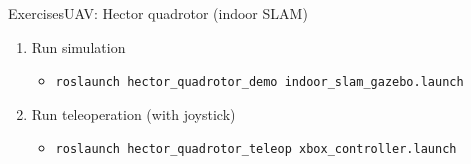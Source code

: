 \documentclass[10pt,compress]{beamer} %
\begin{document}
\begin{frame}{Exercises}{UAV: Hector quadrotor (indoor SLAM)}
	\begin{enumerate}
		\item Run simulation
			\begin{itemize}
			\item \texttt{roslaunch hector\_quadrotor\_demo indoor\_slam\_gazebo.launch}
			\end{itemize}
		\item Run teleoperation (with joystick)
			\begin{itemize}
			\item \texttt{roslaunch hector\_quadrotor\_teleop xbox\_controller.launch}
			\end{itemize}
	\end{enumerate}
\end{frame}
\end{document}

